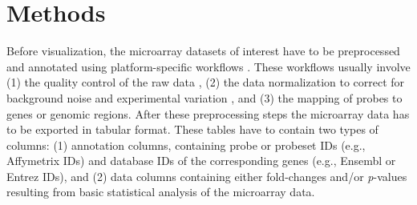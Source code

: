 \documentclass{bioinfo}
\begin{document}




\section{Methods}

Before visualization, the microarray datasets of interest have to be preprocessed and annotated
using platform-specific workflows \citep{Limma, AgiMicroRna}. These workflows usually involve (1)
the quality control of the raw data \citep{arrayQualityMetrics}, (2) the data normalization to
correct for background noise and experimental variation \citep{Lim2007}, and (3) the mapping of
probes to genes or genomic regions. After these preprocessing steps the microarray data has to be
exported in tabular format. These tables have to contain two types of columns: (1) annotation
columns, containing probe or probeset IDs (e.g., Affymetrix IDs) and database IDs of the
corresponding genes (e.g., Ensembl or Entrez IDs), and (2) data columns containing either
fold-changes and/or \emph{p}-values resulting from basic statistical analysis of the microarray
data.
\end{document}
